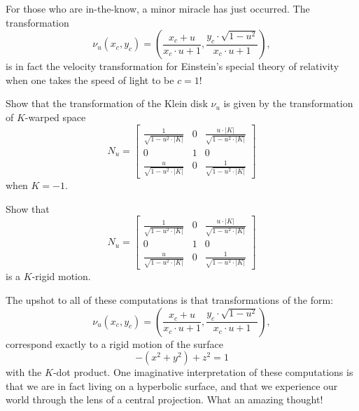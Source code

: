 \documentclass{ximera}
\begin{document}
For those who are in-the-know, a minor miracle has just occurred. The transformation
\[
  \nu_u(x_c,y_c) = \left(\frac{x_c + u}{x_c\cdot u + 1},\frac{y_c\cdot \sqrt{1-u^2}}{x_c\cdot u+1}\right),
\]
is in fact the velocity transformation for Einstein's special theory
of relativity when one takes the speed of light to be $c=1$!

\begin{problem}
Show that the transformation of the Klein disk $\nu_u$ is
given by the transformation of $K$-warped space
\[
N_u = 
\begin{bmatrix}
  \frac{1}{\sqrt{1-u^2\cdot|K|}} & 0 & \frac{u\cdot|K|}{\sqrt{1-u^2\cdot|K|}}\\
  0 & 1 & 0\\
  \frac{u}{\sqrt{1-u^2\cdot|K|}} & 0 & \frac{1}{\sqrt{1-u^2\cdot|K|}}
\end{bmatrix}
\]
when $K=-1$.
\end{problem}

\begin{problem}
  Show that
  \[
  N_u = 
  \begin{bmatrix}
    \frac{1}{\sqrt{1-u^2\cdot|K|}} & 0 & \frac{u\cdot|K|}{\sqrt{1-u^2\cdot|K|}}\\
    0 & 1 & 0\\
    \frac{u}{\sqrt{1-u^2\cdot|K|}} & 0 & \frac{1}{\sqrt{1-u^2\cdot|K|}}
  \end{bmatrix}
  \]
  is a $K$-rigid motion.
\end{problem}

The upshot to all of these computations is that transformations of the form:
\[
\nu_u(x_c,y_c) = \left(\frac{x_c + u}{x_c\cdot u + 1},\frac{y_c\cdot \sqrt{1-u^2}}{x_c\cdot u+1}\right),
\]
correspond exactly to a rigid motion of the surface
\[
-(x^2+y^2) + z^2 =1
\]
with the $K$-dot product. One imaginative interpretation of these
computations is that we are in fact living on a hyperbolic surface,
and that we experience our world through the lens of a central
projection. What an amazing thought!






\end{document}
